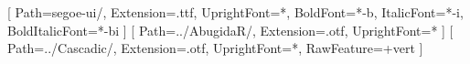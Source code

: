 \setmainfont{segoe-ui}[
	Path=segoe-ui/,
	Extension=.ttf,
	UprightFont=*,
	BoldFont=*-b,
	ItalicFont=*-i,
	BoldItalicFont=*-bi
]
\newfontfamily{}[
	Path=../AbugidaR/,
	Extension=.otf,
	UprightFont=*
]
\newenvironment{AbRBlock}{\AbugidaR}{}
\newfontfamily{}[
	Path=../Cascadic/,
	Extension=.otf,
	UprightFont=*,
	RawFeature={+vert}
]
\newenvironment{CasBlock}{\Cascadic}{}
\makeglossaries

